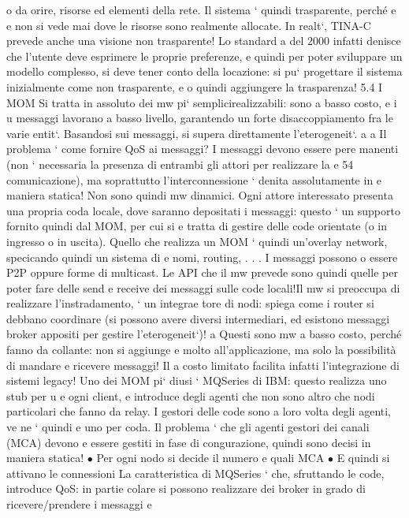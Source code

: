 \documentclass[a4paper,12pt]{article}
\begin{document}
o
da orire, risorse ed elementi della rete. Il sistema ` quindi trasparente, perché
e
e
non si vede mai dove le risorse sono realmente allocate.
In realt`, TINA-C prevede anche una visione non trasparente! Lo standard
a
del 2000 infatti denisce che l'utente deve esprimere le proprie preferenze, e
quindi per poter sviluppare un modello complesso, si deve tener conto della
locazione: si pu` progettare il sistema inizialmente come non trasparente, e
o
quindi aggiungere la trasparenza!
5.4
I MOM
Si tratta in assoluto dei mw pi` semplicirealizzabili: sono a basso costo, e i
u
messaggi lavorano a basso livello, garantendo un forte disaccoppiamento fra le
varie entit`. Basandosi sui messaggi, si supera direttamente l'eterogeneit`.
a
a
Il problema ` come fornire QoS ai messaggi? I messaggi devono essere pere
manenti (non ` necessaria la presenza di entrambi gli attori per realizzare la
e
54
comunicazione), ma soprattutto l'interconnessione ` denita assolutamente in
e
maniera statica! Non sono quindi mw dinamici.
Ogni attore interessato presenta una propria coda locale, dove saranno depositati i messaggi: questo ` un supporto
fornito quindi dal MOM, per cui si
e
tratta di gestire delle code orientate (o in ingresso o in uscita). Quello che realizza un MOM ` quindi un'overlay
network, specicando quindi un sistema di
e
nomi, routing, . . .
I messaggi possono o essere P2P oppure forme di multicast. Le API che il
mw prevede sono quindi quelle per poter fare delle send e receive dei messaggi
sulle code locali!Il mw si preoccupa di realizzare l'instradamento, ` un integrae
tore di nodi: spiega come i router si debbano coordinare (si possono avere diversi
intermediari, ed esistono messaggi broker appositi per gestire l'eterogeneit`)!
a
Questi sono mw a basso costo, perché fanno da collante: non si aggiunge
e
molto all'applicazione, ma solo la possibilità di mandare e ricevere messaggi! Il
a
costo limitato facilita infatti l'integrazione di sistemi legacy!
Uno dei MOM pi` diusi ` MQSeries di IBM: questo realizza uno stub per
u
e
ogni client, e introduce degli agenti che non sono altro che nodi particolari che
fanno da relay. I gestori delle code sono a loro volta degli agenti, ve ne ` quindi
e
uno per coda. Il problema ` che gli agenti gestori dei canali (MCA) devono
e
essere gestiti in fase di congurazione, quindi sono decisi in maniera statica!
$\bullet$ Per ogni nodo si decide il numero e quali MCA
$\bullet$ E quindi si attivano le connessioni
La caratteristica di MQSeries ` che, sfruttando le code, introduce QoS: in partie
colare si possono realizzare dei broker in grado di ricevere/prendere i messaggi e
\end{document}
